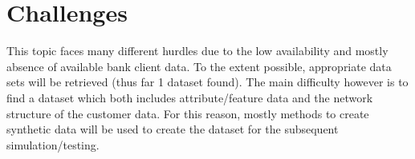 	\section{Challenges}

	\noindent This topic faces many different hurdles due to the low availability and mostly absence of available bank client data. To the extent 
	possible, appropriate data sets will be retrieved (thus far 1 dataset found). The main difficulty however is to find a dataset which both includes 
	attribute/feature data and the network structure of the customer data. For this reason, mostly methods to create synthetic data will be used to 
	create the dataset for the subsequent simulation/testing.


